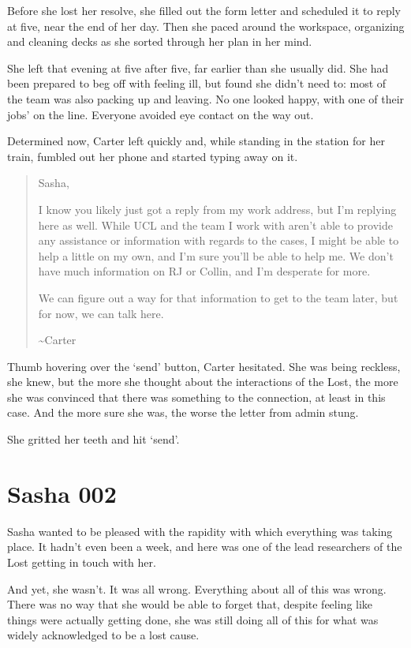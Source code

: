 Before she lost her resolve, she filled out the form letter and scheduled it to reply at five, near the end of her day. Then she paced around the workspace, organizing and cleaning decks as she sorted through her plan in her mind.

She left that evening at five after five, far earlier than she usually did. She had been prepared to beg off with feeling ill, but found she didn't need to: most of the team was also packing up and leaving. No one looked happy, with one of their jobs' on the line. Everyone avoided eye contact on the way out.

Determined now, Carter left quickly and, while standing in the station for her train, fumbled out her phone and started typing away on it.

\begin{quote}
Sasha,

I know you likely just got a reply from my work address, but I'm replying here as well. While UCL and the team I work with aren't able to provide any assistance or information with regards to the cases, I might be able to help a little on my own, and I'm sure you'll be able to help me. We don't have much information on RJ or Collin, and I'm desperate for more.

We can figure out a way for that information to get to the team later, but for now, we can talk here.

\textasciitilde{}Carter
\end{quote}

Thumb hovering over the `send' button, Carter hesitated. She was being reckless, she knew, but the more she thought about the interactions of the Lost, the more she was convinced that there was something to the connection, at least in this case. And the more sure she was, the worse the letter from admin stung.

She gritted her teeth and hit `send'.

\chapter*{Sasha 002}

Sasha wanted to be pleased with the rapidity with which everything was taking place. It hadn't even been a week, and here was one of the lead researchers of the Lost getting in touch with her.

And yet, she wasn't. It was all wrong. Everything about all of this was wrong. There was no way that she would be able to forget that, despite feeling like things were actually getting done, she was still doing all of this for what was widely acknowledged to be a lost cause.


